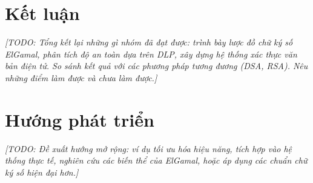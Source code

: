 \documentclass[../DoAn.tex]{subfiles}
\begin{document}
\section{Kết luận}
\label{section:6.1}

\textit{[TODO: Tổng kết lại những gì nhóm đã đạt được: trình bày lược đồ chữ ký số ElGamal, phân tích độ an toàn dựa trên DLP, xây dựng hệ thống xác thực văn bản điện tử. So sánh kết quả với các phương pháp tương đương (DSA, RSA). Nêu những điểm làm được và chưa làm được.]}

\section{Hướng phát triển}
\label{section:6.2}

\textit{[TODO: Đề xuất hướng mở rộng: ví dụ tối ưu hóa hiệu năng, tích hợp vào hệ thống thực tế, nghiên cứu các biến thể của ElGamal, hoặc áp dụng các chuẩn chữ ký số hiện đại hơn.]}
\end{document}
